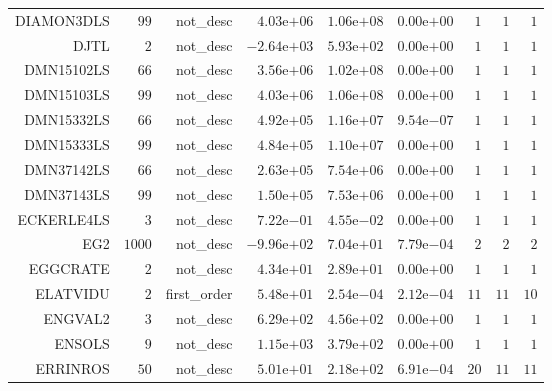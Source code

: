 \begin{longtable}{rrrrrrrrr}
DIAMON3DLS & \(    99\) & not\_desc & \( 4.03\)e\(+06\) & \( 1.06\)e\(+08\) & \( 0.00\)e\(+00\) & \(     1\) & \(     1\) & \(     1\) \\
DJTL & \(     2\) & not\_desc & \(-2.64\)e\(+03\) & \( 5.93\)e\(+02\) & \( 0.00\)e\(+00\) & \(     1\) & \(     1\) & \(     1\) \\
DMN15102LS & \(    66\) & not\_desc & \( 3.56\)e\(+06\) & \( 1.02\)e\(+08\) & \( 0.00\)e\(+00\) & \(     1\) & \(     1\) & \(     1\) \\
DMN15103LS & \(    99\) & not\_desc & \( 4.03\)e\(+06\) & \( 1.06\)e\(+08\) & \( 0.00\)e\(+00\) & \(     1\) & \(     1\) & \(     1\) \\
DMN15332LS & \(    66\) & not\_desc & \( 4.92\)e\(+05\) & \( 1.16\)e\(+07\) & \( 9.54\)e\(-07\) & \(     1\) & \(     1\) & \(     1\) \\
DMN15333LS & \(    99\) & not\_desc & \( 4.84\)e\(+05\) & \( 1.10\)e\(+07\) & \( 0.00\)e\(+00\) & \(     1\) & \(     1\) & \(     1\) \\
DMN37142LS & \(    66\) & not\_desc & \( 2.63\)e\(+05\) & \( 7.54\)e\(+06\) & \( 0.00\)e\(+00\) & \(     1\) & \(     1\) & \(     1\) \\
DMN37143LS & \(    99\) & not\_desc & \( 1.50\)e\(+05\) & \( 7.53\)e\(+06\) & \( 0.00\)e\(+00\) & \(     1\) & \(     1\) & \(     1\) \\
ECKERLE4LS & \(     3\) & not\_desc & \( 7.22\)e\(-01\) & \( 4.55\)e\(-02\) & \( 0.00\)e\(+00\) & \(     1\) & \(     1\) & \(     1\) \\
EG2 & \(  1000\) & not\_desc & \(-9.96\)e\(+02\) & \( 7.04\)e\(+01\) & \( 7.79\)e\(-04\) & \(     2\) & \(     2\) & \(     2\) \\
EGGCRATE & \(     2\) & not\_desc & \( 4.34\)e\(+01\) & \( 2.89\)e\(+01\) & \( 0.00\)e\(+00\) & \(     1\) & \(     1\) & \(     1\) \\
ELATVIDU & \(     2\) & first\_order & \( 5.48\)e\(+01\) & \( 2.54\)e\(-04\) & \( 2.12\)e\(-04\) & \(    11\) & \(    11\) & \(    10\) \\
ENGVAL2 & \(     3\) & not\_desc & \( 6.29\)e\(+02\) & \( 4.56\)e\(+02\) & \( 0.00\)e\(+00\) & \(     1\) & \(     1\) & \(     1\) \\
ENSOLS & \(     9\) & not\_desc & \( 1.15\)e\(+03\) & \( 3.79\)e\(+02\) & \( 0.00\)e\(+00\) & \(     1\) & \(     1\) & \(     1\) \\
ERRINROS & \(    50\) & not\_desc & \( 5.01\)e\(+01\) & \( 2.18\)e\(+02\) & \( 6.91\)e\(-04\) & \(    20\) & \(    11\) & \(    11\) \\

\end{longtable}
